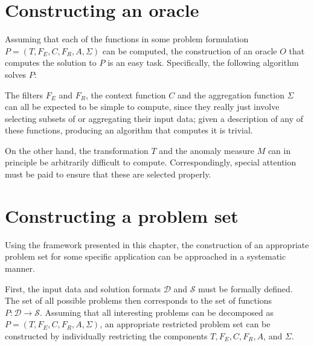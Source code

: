 \section{Constructing an oracle}

Assuming that each of the functions in some problem formulation $P = (T, F_E, C, F_R, A, \Sigma)$ can be computed, the construction of an oracle $O$ that computes the solution to $P$ is an easy task. Specifically, the following algorithm solves $P$:

\begin{algorithmic}
     
    \EndFor{}
\end{algorithmic}

The filters $F_E$ and $F_R$, the context function $C$ and the aggregation function $\Sigma$ can all be expected to be simple to compute, since they really just involve selecting subsets of or aggregating their input data; given a description of any of these functions, producing an algorithm that computes it is trivial.

On the other hand, the transformation $T$ and the anomaly measure $M$ can in principle be arbitrarily difficult to compute. Correspondingly, special attention must be paid to ensure that these are selected properly.

\section{Constructing a problem set}

Using the framework presented in this chapter, the construction of an appropriate problem set for some specific application can be approached in a systematic manner.

First, the input data and solution formats $\mathcal{D}$ and $\mathcal{S}$ must be formally defined. The set of all possible problems then corresponds to the set of functions $P: \mathcal{D} \rightarrow \mathcal{S}$. Assuming that all interesting problems can be decomposed as $P = (T, F_E, C, F_R, A, \Sigma)$, an appropriate restricted problem set can be constructed by individually restricting the components $T, F_E, C, F_R, A$, and $\Sigma$.


